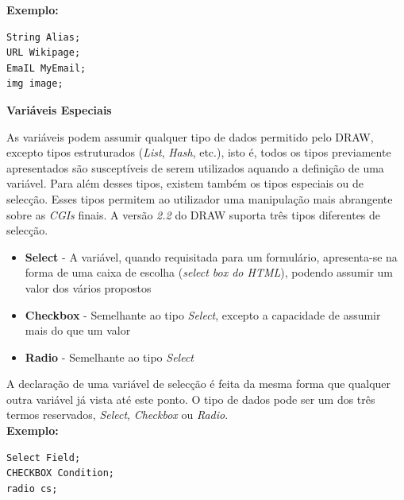 \documentclass[a4paper]{article}
\begin{document}
\textbf{Exemplo:}

\begin{small}
\begin{lstlisting}
String Alias;
URL Wikipage;
EmaIL MyEmail;
img image;
\end{lstlisting}
\end{small}

\vspace{.2cm}
\begin{normalsize}
\textbf{Variáveis Especiais}\\
\end{normalsize}

\hspace{1cm}As variáveis podem assumir qualquer tipo de dados permitido pelo DRAW, excepto tipos estruturados (\emph{List}, \emph{Hash},
etc.), isto é, todos os tipos previamente apresentados são susceptíveis de serem utilizados aquando a definição de uma variável. Para
além desses tipos, existem também os tipos especiais ou de selecção. Esses tipos permitem ao utilizador uma manipulação mais abrangente
sobre as \emph{CGIs} finais. A versão \emph{2.2} do DRAW suporta três tipos diferentes de selecção.\\

\begin{itemize}
        \item \textbf{Select} - A variável, quando requisitada para um formulário, apresenta-se na forma de uma caixa de escolha
        (\emph{select box do HTML}), podendo assumir um valor dos vários propostos
        \item \textbf{Checkbox} - Semelhante ao tipo \emph{Select}, excepto a capacidade de assumir mais do que um valor
        \item \textbf{Radio} - Semelhante ao tipo \emph{Select}\\
\end{itemize}

A declaração de uma variável de selecção é feita da mesma forma que qualquer outra variável já vista até este ponto. O tipo de dados pode
ser um dos três termos reservados, \emph{Select}, \emph{Checkbox} ou \emph{Radio}.\\

\textbf{Exemplo:}

\begin{small}
\begin{lstlisting}
Select Field;
CHECKBOX Condition;
radio cs;
\end{lstlisting}
\end{small}
\end{document}
